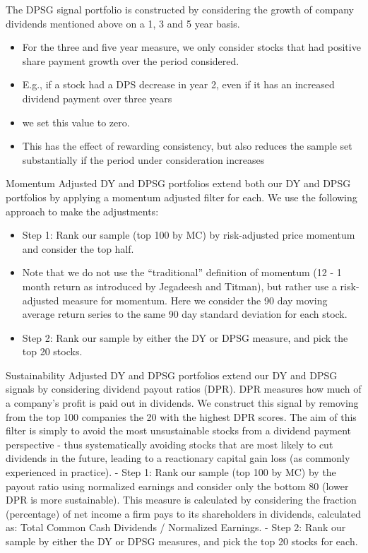 \documentclass[11pt,preprint, authoryear]{elsarticle}
\numberwithin{equation}{section}
\numberwithin{figure}{section}
\numberwithin{table}{section}
\def\tightlist{} %
\begin{document}
The DPSG signal portfolio is constructed by considering the growth of
company dividends mentioned above on a 1, 3 and 5 year basis.

\begin{itemize}
\tightlist
\item
  For the three and five year measure, we only consider stocks that had
  positive share payment growth over the period considered.
\item
  E.g., if a stock had a DPS decrease in year 2, even if it has an
  increased dividend payment over three years
\item
  we set this value to zero.
\item
  This has the effect of rewarding consistency, but also reduces the
  sample set substantially if the period under consideration increases
\end{itemize}

Momentum Adjusted DY and DPSG portfolios extend both our DY and DPSG
portfolios by applying a momentum adjusted filter for each. We use the
following approach to make the adjustments:

\begin{itemize}
\tightlist
\item
  Step 1: Rank our sample (top 100 by MC) by risk-adjusted price
  momentum and consider the top half.
\item
  Note that we do not use the ``traditional'' definition of momentum (12
  - 1 month return as introduced by Jegadeesh and Titman), but rather
  use a risk-adjusted measure for momentum. Here we consider the 90 day
  moving average return series to the same 90 day standard deviation for
  each stock.
\item
  Step 2: Rank our sample by either the DY or DPSG measure, and pick the
  top 20 stocks.
\end{itemize}

Sustainability Adjusted DY and DPSG portfolios extend our DY and DPSG
signals by considering dividend payout ratios (DPR). DPR measures how
much of a company's profit is paid out in dividends. We construct this
signal by removing from the top 100 companies the 20 with the highest
DPR scores. The aim of this filter is simply to avoid the most
unsustainable stocks from a dividend payment perspective - thus
systematically avoiding stocks that are most likely to cut dividends in
the future, leading to a reactionary capital gain loss (as commonly
experienced in practice). - Step 1: Rank our sample (top 100 by MC) by
the payout ratio using normalized earnings and consider only the bottom
80 (lower DPR is more sustainable). This measure is calculated by
considering the fraction (percentage) of net income a firm pays to its
shareholders in dividends, calculated as: Total Common Cash Dividends /
Normalized Earnings. - Step 2: Rank our sample by either the DY or DPSG
measures, and pick the top 20 stocks for each.
\end{document}
